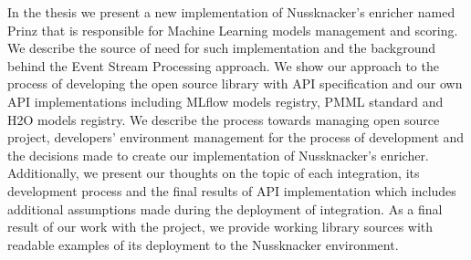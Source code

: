 In the thesis we present a new implementation of Nussknacker's enricher named Prinz that is responsible for
Machine Learning models management and scoring. We describe the source of need for such implementation and
the background behind the Event Stream Processing approach. We show our approach to the process of developing
the open source library with API specification and our own API implementations including MLflow models
registry, PMML standard and H2O models registry. We describe the process towards managing open source project,
developers' environment management for the process of development and the decisions made to create our
implementation of Nussknacker’s enricher. Additionally, we present our thoughts on the topic of each integration,
its development process and the final results of API implementation which includes additional assumptions made
during the deployment of integration. As a final result of our work with the project, we provide working
library sources with readable examples of its deployment to the Nussknacker environment.
